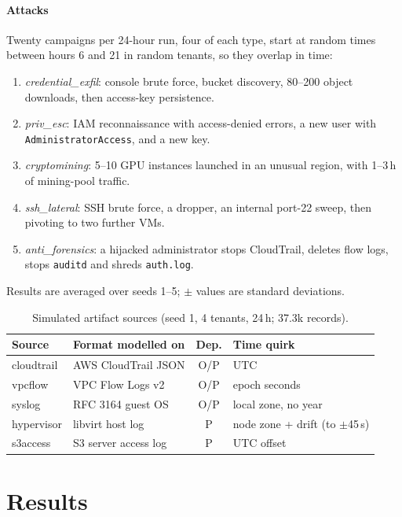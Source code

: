 \documentclass[conference,10pt]{IEEEtran}
\begin{document}
\paragraph*{Attacks} Twenty campaigns per 24-hour run, four of each type, start at random times between hours 6 and 21 in random tenants, so they overlap in time:
\begin{enumerate}
\item \emph{credential\_exfil}: console brute force, bucket discovery, 80--200 object downloads, then access-key persistence.
\item \emph{priv\_esc}: IAM reconnaissance with access-denied errors, a new user with \texttt{AdministratorAccess}, and a new key.
\item \emph{cryptomining}: 5--10 GPU instances launched in an unusual region, with 1--3\,h of mining-pool traffic.
\item \emph{ssh\_lateral}: SSH brute force, a dropper, an internal port-22 sweep, then pivoting to two further VMs.
\item \emph{anti\_forensics}: a hijacked administrator stops CloudTrail, deletes flow logs, stops \texttt{auditd} and shreds \texttt{auth.log}.
\end{enumerate}
Results are averaged over seeds 1--5; $\pm$ values are standard deviations.

\begin{table}[t]
\centering
\caption{Simulated artifact sources (seed 1, 4 tenants, 24\,h; 37.3k records).}
\label{tab:data}
\footnotesize
\setlength{\tabcolsep}{3pt}
\begin{tabular}{llcl}
\toprule
Source & Format modelled on & Dep. & Time quirk \\
\midrule
cloudtrail & AWS CloudTrail JSON & O/P & UTC \\
vpcflow & VPC Flow Logs v2 & O/P & epoch seconds \\
syslog & RFC 3164 guest OS & O/P & local zone, no year \\
hypervisor & libvirt host log & P & node zone + drift (to $\pm$45\,s) \\
s3access & S3 server access log & P & UTC offset \\
\bottomrule
\end{tabular}
\end{table}

\section{Results}
\label{sec:results}
\end{document}
